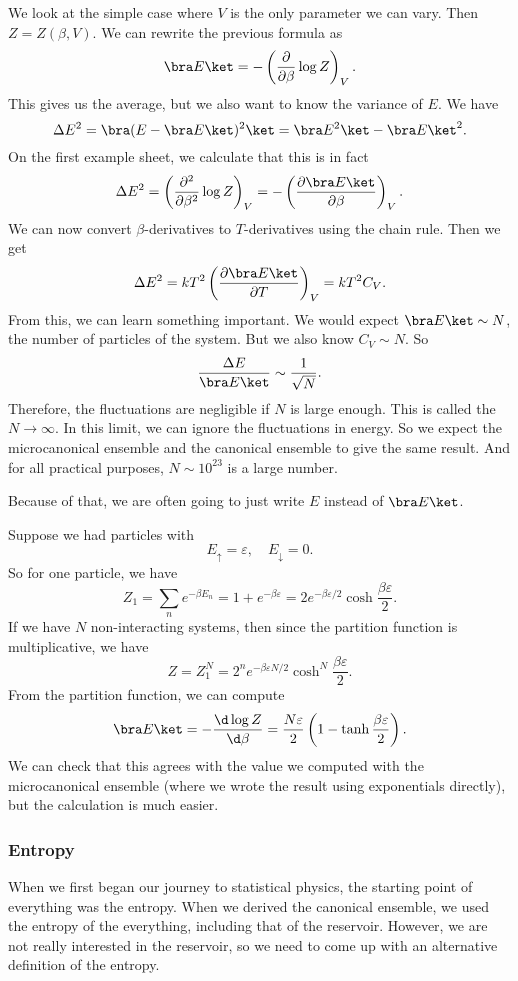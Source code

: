 \documentclass[a4paper]{article}
\begin{document}
We look at the simple case where $V$ is the only parameter we can vary. Then $Z = Z(\beta, V)$. We can rewrite the previous formula as
\[
  \bra E \ket = - \left(\frac{\partial}{\partial \beta} \log Z\right)_V.
\]
This gives us the average, but we also want to know the variance of $E$. We have
\[
  \Delta E^2 = \bra (E - \bra E\ket)^2 \ket = \bra E^2\ket - \bra E\ket^2.
\]
On the first example sheet, we calculate that this is in fact
\[
  \Delta E^2 = \left(\frac{\partial^2}{\partial \beta^2} \log Z\right)_V = - \left(\frac{\partial \bra E\ket}{\partial \beta}\right)_V.
\]
We can now convert $\beta$-derivatives to $T$-derivatives using the chain rule. Then we get
\[
  \Delta E^2 = kT^2 \left(\frac{\partial \bra E\ket}{\partial T}\right)_V = kT^2 C_V.
\]
From this, we can learn something important. We would expect $\bra E\ket \sim N$, the number of particles of the system. But we also know $C_V \sim N$. So
\[
  \frac{\Delta E}{\bra E\ket} \sim \frac{1}{\sqrt{N}}.
\]
Therefore, the fluctuations are negligible if $N$ is large enough. This is called the  $N \to \infty$. In this limit, we can ignore the fluctuations in energy. So we expect the microcanonical ensemble and the canonical ensemble to give the same result. And for all practical purposes, $N \sim 10^{23}$ is a large number.

Because of that, we are often going to just write $E$ instead of $\bra E\ket$.

\begin{eg}
  Suppose we had particles with
  \[
    E_{\uparrow} = \varepsilon,\quad E_{\downarrow} = 0.
  \]
  So for one particle, we have
  \[
    Z_1 = \sum_n e^{-\beta E_n} = 1 + e^{-\beta \varepsilon} = 2 e^{-\beta \varepsilon/2} \cosh \frac{\beta \varepsilon}{2}.
  \]
  If we have $N$ non-interacting systems, then since the partition function is multiplicative, we have
  \[
    Z = Z_1^N = 2^n e^{-\beta \varepsilon N/2} \cosh^N \frac{\beta \varepsilon}{2}.
  \]
  From the partition function, we can compute
  \[
    \bra E \ket = - \frac{\d \log Z}{\d \beta} = \frac{N\varepsilon}{2}\left(1 - \tanh \frac{\beta \varepsilon}{2}\right).
  \]
  We can check that this agrees with the value we computed with the microcanonical ensemble (where we wrote the result using exponentials directly), but the calculation is much easier.
\end{eg}

\subsubsection*{Entropy}
When we first began our journey to statistical physics, the starting point of everything was the entropy. When we derived the canonical ensemble, we used the entropy of the everything, including that of the reservoir. However, we are not really interested in the reservoir, so we need to come up with an alternative definition of the entropy.
\end{document}
